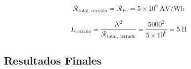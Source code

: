 \documentclass[12pt,a4paper]{article}
\begin{document}
\begin{equation}
    \mathcal{R}_{\text{total, cerrado}} = \mathcal{R}_{\text{Fe}} = 5 \times 10^{6}\ \si{\ampere\volt\per\weber}
\end{equation}

\begin{equation}
    L_{\text{cerrado}} = \frac{N^2}{\mathcal{R}_{\text{total, cerrado}}}
    = \frac{5000^2}{5 \times 10^{6}}
    = \SI{5}{\henry}
\end{equation}

\subsection{Resultados Finales}

\noindent{}
\end{document}
